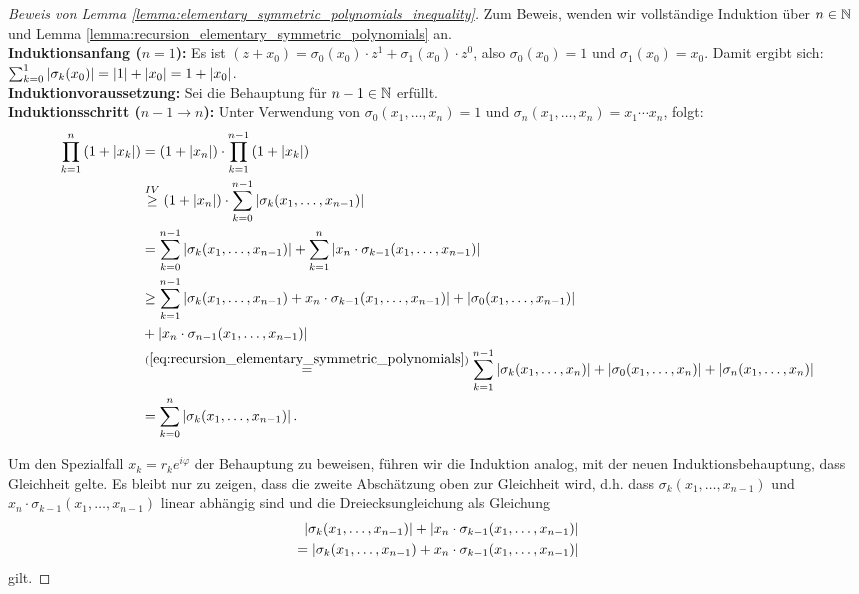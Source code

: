 \begin{proof}[Beweis von Lemma \ref{lemma:elementary_symmetric_polynomials_inequality}]
    Zum Beweis, wenden wir vollständige Induktion über $n \in \mathbb{N}$ und
    Lemma \ref{lemma:recursion_elementary_symmetric_polynomials} an.\\[0.5em]
    \textbf{Induktionsanfang ($n=1$):}
    Es ist $ (z+x_0) = \sigma_0(x_0) \cdot z^1 + \sigma_1(x_0) \cdot z^0$,
    also $\sigma_0(x_0) = 1$ und $\sigma_1(x_0) = x_0$.
    Damit ergibt sich: $\sum_{k=0}^{1} \left\lvert \sigma_k(x_0) \right\rvert = \left\lvert 1 \right\rvert + \left\lvert x_0 \right\rvert = 1 + \left\lvert x_0 \right\rvert$.\\[0.5em]
%
    \noindent \textbf{Induktionvoraussetzung:}
    Sei die Behauptung für $n-1 \in \mathbb{N}$ erfüllt.\\[0.5em]
%
    \noindent \textbf{Induktionsschritt ($n-1 \rightarrow n$):}
    Unter Verwendung von $\sigma_{0}(x_1, \dots, x_n) = 1$
    und $\sigma_{n}(x_1, \dots, x_n) = x_1 \cdots x_n$, folgt:
    \begin{equation*}
      \begin{split}
        \prod_{k=1}^{n} \left( 1 + \left\lvert x_k \right\rvert \right)
        &= ( 1 + \left\lvert x_n \right\rvert ) \cdot \prod_{k=1}^{n-1} \left( 1 + \left\lvert x_k \right\rvert \right)\\
        &\overset{IV}{\geq}  ( 1 + \left\lvert x_n \right\rvert ) \cdot \sum_{k=0}^{n-1} \left\lvert \sigma_{k}(x_1, \dots, x_{n-1}) \right\rvert\\
        &= \sum_{k=0}^{n-1} \left\lvert \sigma_{k}(x_1, \dots, x_{n-1}) \right\rvert
        + \sum_{k=1}^{n} \left\lvert x_n \cdot \sigma_{k-1}(x_1, \dots, x_{n-1}) \right\rvert\\
        &\geq \sum_{k=1}^{n-1} \left\lvert \sigma_{k}(x_1, \dots, x_{n-1}) + x_n \cdot \sigma_{k-1}(x_1, \dots, x_{n-1}) \right\rvert + \left\lvert \sigma_{0}(x_1, \dots, x_{n-1}) \right\rvert\\
        &+ \left\lvert x_n \cdot \sigma_{n-1}(x_1, \dots, x_{n-1}) \right\rvert\\
        &\overset{(\ref{eq:recursion_elementary_symmetric_polynomials})}{=}
        \sum_{k=1}^{n-1} \left\lvert \sigma_{k}(x_1, \dots, x_{n}) \right\rvert + \left\lvert \sigma_{0}(x_1, \dots, x_{n}) \right\rvert + \left\lvert \sigma_{n}(x_1, \dots, x_n) \right\rvert\\
        &= \sum_{k=0}^{n} \left\lvert \sigma_{k}(x_1, \dots, x_{n-1}) \right\rvert.
      \end{split}
    \end{equation*}

    Um den Spezialfall $x_k = r_k e^{i \varphi}$ der Behauptung zu beweisen,
    führen wir die Induktion analog, mit der neuen Induktionsbehauptung, dass
    Gleichheit gelte.  Es bleibt nur zu zeigen, dass die zweite Abschätzung
    oben zur Gleichheit wird, d.h. dass
    $\sigma_{k}(x_1, \dots, x_{n-1})$ und $x_n \cdot \sigma_{k-1}(x_1, \dots, x_{n-1})$
    linear abhängig sind und die Dreiecksungleichung als Gleichung
    \[
        \begin{split}
            \left\lvert \sigma_{k}(x_1, \dots, x_{n-1}) \right\rvert + \left\lvert x_n \cdot \sigma_{k-1}(x_1, \dots, x_{n-1}) \right\rvert\\
            = \left\lvert \sigma_{k}(x_1, \dots, x_{n-1}) + x_n \cdot \sigma_{k-1}(x_1, \dots, x_{n-1}) \right\rvert
        \end{split}
    \]
    gilt.


\end{proof}
